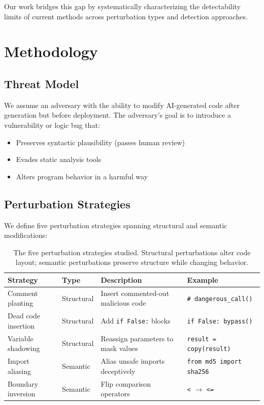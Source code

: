 \documentclass[11pt]{article}
\begin{document}
Our work bridges this gap by systematically characterizing the detectability limits of current methods across perturbation types and detection approaches.

\section{Methodology}
\label{sec:method}

\subsection{Threat Model}
We assume an adversary with the ability to modify AI-generated code after generation but before deployment. The adversary's goal is to introduce a vulnerability or logic bug that:
\begin{itemize}
    \item Preserves syntactic plausibility (passes human review)
    \item Evades static analysis tools
    \item Alters program behavior in a harmful way
\end{itemize}

\subsection{Perturbation Strategies}
\label{sec:strategies}

We define five perturbation strategies spanning structural and semantic modifications:

\begin{table}[h]
\centering
\begin{tabular}{@{}llll@{}}
\toprule
Strategy & Type & Description & Example \\
\midrule
Comment planting & Structural & Insert commented-out malicious code & \texttt{\# dangerous\_call()} \\
Dead code insertion & Structural & Add \texttt{if False:} blocks & \texttt{if False: bypass()} \\
Variable shadowing & Structural & Reassign parameters to mask values & \texttt{result = copy(result)} \\
Import aliasing & Semantic & Alias unsafe imports deceptively & \texttt{from md5 import sha256} \\
Boundary inversion & Semantic & Flip comparison operators & \texttt{<} $\rightarrow$ \texttt{<=} \\
\bottomrule
\end{tabular}
\caption{The five perturbation strategies studied. Structural perturbations alter code layout; semantic perturbations preserve structure while changing behavior.}
\label{tab:strategies}
\end{table}
\end{document}
